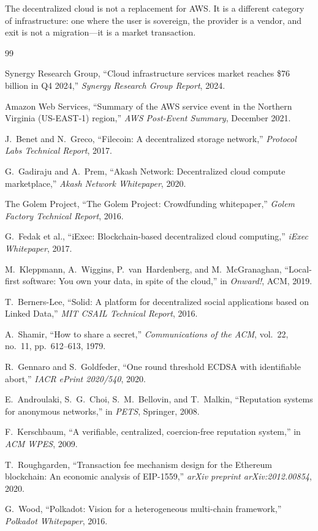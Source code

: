 \documentclass[11pt,a4paper]{article}
\begin{document}
The decentralized cloud is not a replacement for AWS. It is a different
category of infrastructure: one where the user is sovereign, the provider
is a vendor, and exit is not a migration---it is a market transaction.

\begin{thebibliography}{99}

Synergy Research Group, ``Cloud infrastructure services market reaches \$76 billion in Q4 2024,'' \emph{Synergy Research Group Report}, 2024.

Amazon Web Services, ``Summary of the AWS service event in the Northern Virginia (US-EAST-1) region,'' \emph{AWS Post-Event Summary}, December 2021.

J.~Benet and N.~Greco, ``Filecoin: A decentralized storage network,'' \emph{Protocol Labs Technical Report}, 2017.

G.~Gadiraju and A.~Prem, ``Akash Network: Decentralized cloud compute marketplace,'' \emph{Akash Network Whitepaper}, 2020.

The Golem Project, ``The Golem Project: Crowdfunding whitepaper,'' \emph{Golem Factory Technical Report}, 2016.

G.~Fedak et al., ``iExec: Blockchain-based decentralized cloud computing,'' \emph{iExec Whitepaper}, 2017.

M.~Kleppmann, A.~Wiggins, P.~van~Hardenberg, and M.~McGranaghan, ``Local-first software: You own your data, in spite of the cloud,'' in \emph{Onward!}, ACM, 2019.

T.~Berners-Lee, ``Solid: A platform for decentralized social applications based on Linked Data,'' \emph{MIT CSAIL Technical Report}, 2016.

A.~Shamir, ``How to share a secret,'' \emph{Communications of the ACM}, vol.~22, no.~11, pp.~612--613, 1979.

R.~Gennaro and S.~Goldfeder, ``One round threshold ECDSA with identifiable abort,'' \emph{IACR ePrint 2020/540}, 2020.

E.~Androulaki, S.~G.~Choi, S.~M.~Bellovin, and T.~Malkin, ``Reputation systems for anonymous networks,'' in \emph{PETS}, Springer, 2008.

F.~Kerschbaum, ``A verifiable, centralized, coercion-free reputation system,'' in \emph{ACM WPES}, 2009.

T.~Roughgarden, ``Transaction fee mechanism design for the Ethereum blockchain: An economic analysis of EIP-1559,'' \emph{arXiv preprint arXiv:2012.00854}, 2020.

G.~Wood, ``Polkadot: Vision for a heterogeneous multi-chain framework,'' \emph{Polkadot Whitepaper}, 2016.

\end{thebibliography}
\end{document}
